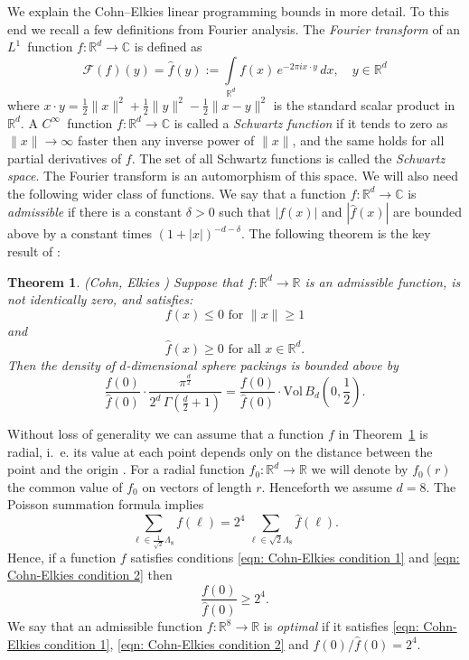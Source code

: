 \documentclass{scrartcl}
\newcommand{\R}{\mathbb{R}}
\newcommand{\C}{\mathbb{C}}
\newtheorem{theorem}{Theorem}
\begin{document}
We explain the Cohn--Elkies linear programming bounds in more detail. To this end we recall a few definitions from Fourier analysis. The \emph{Fourier transform} of an $L^1$~function $f:\R^d\to\C$ is defined as
$$\mathcal{F}(f)(y)=\widehat{f}(y):=\int\limits_{\R^d} f(x)\,e^{-2\pi i x\cdot y}\,dx,\quad y\in\R^d $$
where $x\cdot y=\frac12\|x\|^2+\frac12\|y\|^2-\frac12\|x-y\|^2$ is the standard scalar product in $\R^d$.
A $C^\infty$~function $f:\R^d\to\C$ is called a \emph{Schwartz function} if it tends to zero as $\|x\|\to\infty$ faster then any inverse power of $\|x\|$, and the same holds for all partial derivatives of $f$. The set of all Schwartz functions is called the \emph{Schwartz space}. The Fourier transform is an automorphism of this space. We will also need the following wider class of functions. We say that a function $f:\R^d\to\C$ is \emph{admissible} if there is a constant $\delta>0$ such that $|f(x)|$ and $|\widehat{f}(x)|$ are bounded above by a constant times $(1+|x|)^{-d-\delta}$.
The following theorem is the key result of \cite{ElkiesCohn}:
\begin{theorem}\label{thm: Cohn-Elkies} (Cohn, Elkies \cite{ElkiesCohn}) Suppose that  $f:\R^d\to\R$ is an admissible function, is not identically zero, and satisfies:
\begin{equation}\label{eqn: Cohn-Elkies condition 1}f(x)\leq 0\mbox{ for } \|x\|\geq 1\end{equation} and
\begin{equation}\label{eqn: Cohn-Elkies condition 2}\widehat{f}(x)\geq0\mbox{ for all } x\in\R^d.\end{equation}
 Then the  density of  $d$-dimensional
 sphere packings is bounded above by $$\frac{f(0)}{\widehat{f}(0)}\cdot \frac{\pi^{\frac{d}{2}}}{2^d\,\Gamma(\textstyle \frac{d}{2}+1)}=\frac{f(0)}{\widehat{f}(0)}\cdot \mathrm{Vol}\,B_d(0,\frac 12).$$
\end{theorem}

 Without loss of generality we can assume that a function $f$ in Theorem~\ref{thm: Cohn-Elkies} is radial, i.~e. its value at each point depends only on the distance between the point and the origin \cite[p. 695]{ElkiesCohn}. For a radial function $f_0:\R^d\to\R$ we will denote by $f_0(r)$ the common value of $f_0$ on vectors of length $r$. Henceforth we assume $d=8$. The Poisson summation formula implies
 $$ \sum_{\ell\in\frac{1}{\sqrt{2}}\Lambda_8}f(\ell)= 2^4\,\sum_{\ell\in\sqrt{2}\Lambda_8}\widehat{f}(\ell).$$
 Hence, if a function $f$ satisfies conditions \eqref{eqn: Cohn-Elkies condition 1} and \eqref{eqn: Cohn-Elkies condition 2} then
 $$ \frac{f(0)}{\widehat{f}(0)}\geq 2^4.$$
 We say that an admissible function $f:\R^8\to\R$ is \emph{optimal} if it satisfies \eqref{eqn: Cohn-Elkies condition 1}, \eqref{eqn: Cohn-Elkies condition 2} and $f(0)/\widehat{f}(0)=2^4$.
\end{document}

